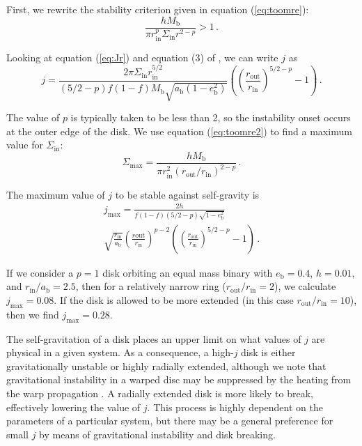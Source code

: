 \documentclass[twocolumn,linenumbers]{aastex631}
\begin{document}
First, we rewrite the stability criterion given in equation (\ref{eq:toomre}):
\begin{equation}
    \label{eq:toomre2}
    \frac{h M_\text{b}}{\pi r_\text{in}^p \Sigma_\text{in} r^{2-p}} > 1\, .
\end{equation}

Looking at equation (\ref{eq:Jr}) and equation (3) of \citet{abod2022}, we can write $j$ as
\begin{equation}
    \label{eq:j-full-disk}
    j = \frac{2\pi \Sigma_\text{in} r_\text{in}^{5/2}}{(5/2-p)f(1-f)M_\text{b}\sqrt{a_\text{b}(1-e_\text{b}^2)}}  \left( \left( \frac{r_\text{out}}{r_\text{in}} \right)^{5/2 - p}- 1\right) \, .
\end{equation}

The value of $p$ is typically taken to be less than 2, so the instability onset occurs at the outer edge of the disk. We use equation (\ref{eq:toomre2}) to find a maximum value for $\Sigma_\text{in}$:
\begin{equation}
    \Sigma_\text{max} = \frac{hM_\text{b}}{\pi r_\text{in}^2 (r_\text{out}/r_\text{in})^{2-p}}\, .
\end{equation}

The maximum value of $j$ to be stable against self-gravity is
\begin{multline}
    \label{eq:jmax-shallow}
    j_\text{max} = \frac{2h}{f (1-f) (5/2 - p)\sqrt{1-e_\text{b}^2}}\\ \sqrt{\frac{r_\text{in}}{a_\text{b}}} \left(\frac{r\text{out}}{r_\text{in}}\right)^{p-2} \left( \left( \frac{r_\text{out}}{r_\text{in}} \right)^{5/2 - p}- 1\right)\, .
\end{multline}

If we consider a $p=1$ disk orbiting an equal mass binary with $e_\text{b}=0.4$, $h=0.01$, and $r_\text{in}/a_\text{b}=2.5$, then for a relatively narrow ring ($r_\text{out}/r_\text{in} = 2$), we calculate $j_\text{max} = 0.08$. If the disk is allowed to be more extended (in this case $r_\text{out}/r_\text{in} = 10$), then we find $j_\text{max} = 0.28$.

The self-gravitation of a disk places an upper limit on what values of $j$ are physical in a given system. As a consequence, a high-$j$ disk is either gravitationally unstable or highly radially extended, although we note that gravitational instability in a warped disc may be suppressed by the heating from the warp propagation \citep{rowther2022}.  A radially extended disk is more likely to break, effectively lowering the value of $j$. This process is highly dependent on the parameters of a particular system, but there may be a general preference for small $j$ by means of gravitational instability and disk breaking. 
\end{document}
